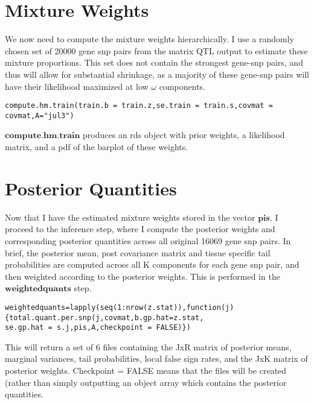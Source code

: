 \documentclass[10pt]{article}
\begin{document}
\begin{itemize}
\section{Mixture Weights}
We now need to compute the mixture weights hierarchically. I use  a randomly chosen set of 20000 gene snp pairs from the matrix QTL output to estimate these mixture proportions. This set does not contain the strongest gene-snp pairs, and thus will allow for substantial shrinkage, as a majority of these gene-snp pairs will  have their likelihood maximized at low $\omega$ components.

\begin{verbatim}
compute.hm.train(train.b = train.z,se.train = train.s,covmat = covmat,A="jul3")
\end{verbatim}

$\textbf{compute.hm.train}$ produces an rds object with prior weights, a likelihood matrix, and a pdf of the barplot of these weights.

\section{Posterior Quantities}
Now that I have the estimated mixture weights stored in the vector $\textbf{pis}$. I proceed to the inference step, where I compute the posterior weights and corresponding posterior quantities across all original 16069 gene snp pairs. In brief, the posterior mean, post covariance matrix and tissue specific tail probabilities are computed across all K components for each gene snp pair, and then weighted according to the posterior weights. This is performed in the $\textbf{weightedquants}$ step.


 \begin{verbatim}
weightedquants=lapply(seq(1:nrow(z.stat)),function(j){total.quant.per.snp(j,covmat,b.gp.hat=z.stat,
se.gp.hat = s.j,pis,A,checkpoint = FALSE)})
\end{verbatim}                          
%  
%
This will return a set of 6 files containing the JxR matrix of posterior means, marginal variances, tail probabilities, local false sign rates, and the JxK matrix of posterior weights. Checkpoint = FALSE means that the files will be created (rather than simply outputting an object array which contains the posterior quantities.



\end{itemize}
\end{document}
